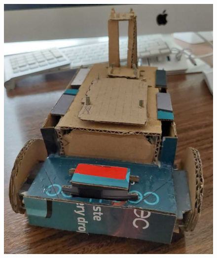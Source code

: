 \begin{figure}[ht!]
	\centering
	\begin{minipage}{0.4\linewidth}
		\centering
		\includegraphics[width=\linewidth]{figs/cap5/boceto_carton5.jpeg}
	\end{minipage}
	\hspace{2cm}
	\begin{minipage}{0.4\linewidth}
		\centering

\end{minipage}
\end{figure}
